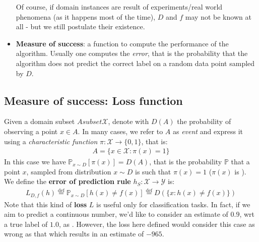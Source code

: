 \documentclass[../template.tex]{subfiles}
\begin{document}
\begin{itemize}
    Of course, if domain instances are result of experiments/real world phenomena (as it happens most of the time), $D$ and $f$ may not be known at all - but we still postulate their existence.
    \item \textbf{Measure of success}: a function to compute the performance of the algorithm. Usually one computes the \textit{error}, that is the probability that the algorithm does not predict the correct label on a random data point sampled by $D$.  
\end{itemize}

\subsection{Measure of success: Loss function}
Given a domain subset $A subset \mathcal{X}$, denote with $D(A)$ the probability of observing a point $x \in A$.
In many cases, we refer to $A$ as \textit{event} and express it using a \textit{characteristic function}  $\pi\colon \mathcal{X} \to \{0,1\}$, that is:
\begin{align*}
    A = \{ x \in \mathcal{X}\colon \pi(x) = 1\}
\end{align*} 
In this case we have $\mathbb{P}_{x \sim D}[\pi(x)] = D(A)$, that is the probability $\mathbb{P}$ that a point $x$, sampled from distribution $x \sim D$ is such that $\pi(x) = 1$ ($\pi(x)$ is ).\\
We define the \textbf{error of prediction rule} $h_S\colon \mathcal{X} \to \mathcal{Y}$ is:
\begin{align*}
    L_{D,f}(h) \overset{\operatorname{def}}{=} \mathbb{P}_{x\sim D}[h(x) \neq f(x)] \overset{\operatorname{def}}{=} D(\{x\colon h(x) \neq f(x)\})
\end{align*} 
Note that this kind of \textbf{loss} $L$ is useful only for classification tasks. In fact, if we aim to predict a continuous number, we'd like to consider an estimate of $0.9$, wrt a true label of $1.0$, as . However, the loss here defined would consider this case as wrong as that which results in an estimate of $-965$.
\end{document}
